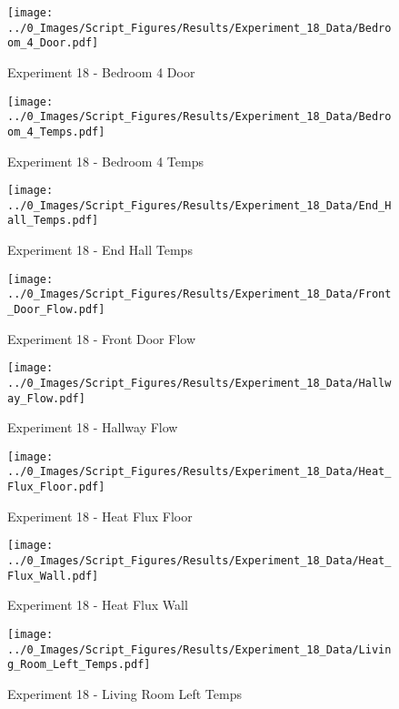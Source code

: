 	\begin{figure}[H]
		\centering
		\texttt{[image: ../0\_Images/Script\_Figures/Results/Experiment\_18\_Data/Bedroom\_4\_Door.pdf]}
		\caption[]{Experiment 18 - Bedroom 4 Door}
	\end{figure}
 
	\clearpage

	\begin{figure}[H]
		\centering
		\texttt{[image: ../0\_Images/Script\_Figures/Results/Experiment\_18\_Data/Bedroom\_4\_Temps.pdf]}
		\caption[]{Experiment 18 - Bedroom 4 Temps}
	\end{figure}
 

	\begin{figure}[H]
		\centering
		\texttt{[image: ../0\_Images/Script\_Figures/Results/Experiment\_18\_Data/End\_Hall\_Temps.pdf]}
		\caption[]{Experiment 18 - End Hall Temps}
	\end{figure}
 
	\clearpage

	\begin{figure}[H]
		\centering
		\texttt{[image: ../0\_Images/Script\_Figures/Results/Experiment\_18\_Data/Front\_Door\_Flow.pdf]}
		\caption[]{Experiment 18 - Front Door Flow}
	\end{figure}
 

	\begin{figure}[H]
		\centering
		\texttt{[image: ../0\_Images/Script\_Figures/Results/Experiment\_18\_Data/Hallway\_Flow.pdf]}
		\caption[]{Experiment 18 - Hallway Flow}
	\end{figure}
 
	\clearpage

	\begin{figure}[H]
		\centering
		\texttt{[image: ../0\_Images/Script\_Figures/Results/Experiment\_18\_Data/Heat\_Flux\_Floor.pdf]}
		\caption[]{Experiment 18 - Heat Flux Floor}
	\end{figure}
 

	\begin{figure}[H]
		\centering
		\texttt{[image: ../0\_Images/Script\_Figures/Results/Experiment\_18\_Data/Heat\_Flux\_Wall.pdf]}
		\caption[]{Experiment 18 - Heat Flux Wall}
	\end{figure}
 
	\clearpage

	\begin{figure}[H]
		\centering
		\texttt{[image: ../0\_Images/Script\_Figures/Results/Experiment\_18\_Data/Living\_Room\_Left\_Temps.pdf]}
		\caption[]{Experiment 18 - Living Room Left Temps}
	\end{figure}
 

